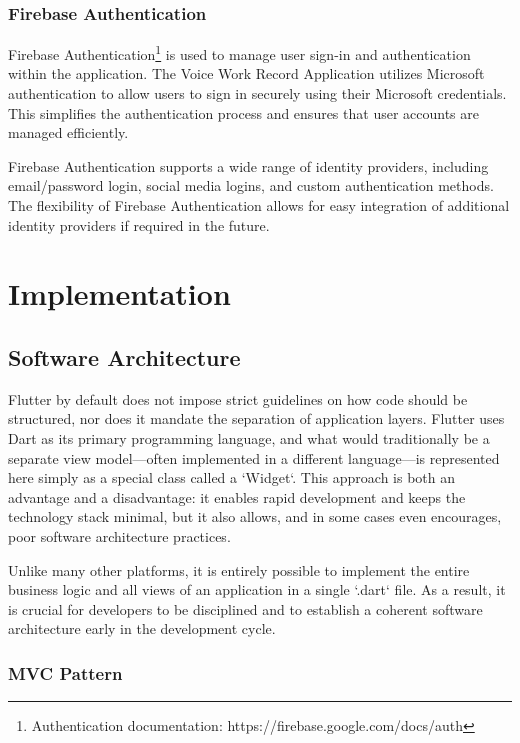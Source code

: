 \documentclass[
  digital,     %
  oneside,     %
  nosansbold,  %
  nocolorbold, %
  lof,         %
  lot,         %
]{fithesis4}
\begin{document}
\subsection{Firebase Authentication}

Firebase Authentication\footnote{Authentication documentation: https://firebase.google.com/docs/auth} is used to manage user sign-in and authentication within the application. The Voice Work Record Application utilizes Microsoft authentication to allow users to sign in securely using their Microsoft credentials. This simplifies the authentication process and ensures that user accounts are managed efficiently.

Firebase Authentication supports a wide range of identity providers, including email/password login, social media logins, and custom authentication methods. The flexibility of Firebase Authentication allows for easy integration of additional identity providers if required in the future.

\chapter{Implementation}

\section{Software Architecture}

Flutter by default does not impose strict guidelines on how code should be structured, nor does it mandate the separation of application layers. Flutter uses Dart as its primary programming language, and what would traditionally be a separate view model—often implemented in a different language—is represented here simply as a special class called a `Widget`. This approach is both an advantage and a disadvantage: it enables rapid development and keeps the technology stack minimal, but it also allows, and in some cases even encourages, poor software architecture practices.

Unlike many other platforms, it is entirely possible to implement the entire business logic and all views of an application in a single `.dart` file. As a result, it is crucial for developers to be disciplined and to establish a coherent software architecture early in the development cycle.

\subsection{MVC Pattern}
\end{document}
